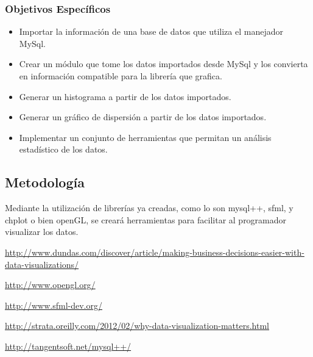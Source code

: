\documentclass[11pt]{article}
\begin{document}
\subsubsection*{Objetivos Específicos}
\begin{itemize}
\item Importar la información de una base de datos que utiliza el manejador MySql.
\item Crear un módulo que tome los datos importados desde MySql y los convierta en información compatible para la librería que grafica.
\item Generar un histograma a partir de los datos importados.
\item Generar un gráfico de dispersión a partir de los datos importados.
\item Implementar un conjunto de herramientas que permitan un análisis estadístico de los datos.
\end{itemize}
\subsection*{Metodología}
Mediante la utilización de librerías ya creadas, como lo son mysql++, sfml, y chplot o bien openGL, se creará herramientas para facilitar al programador visualizar los datos.
\begin{thebibliography}{10}

\url{http://www.dundas.com/discover/article/making-business-decisions-easier-with-data-visualizations/}

\url{http://www.opengl.org/}

\url{http://www.sfml-dev.org/}

\url{http://strata.oreilly.com/2012/02/why-data-visualization-matters.html}

\url{http://tangentsoft.net/mysql++/}

\end{thebibliography}
\end{document}
